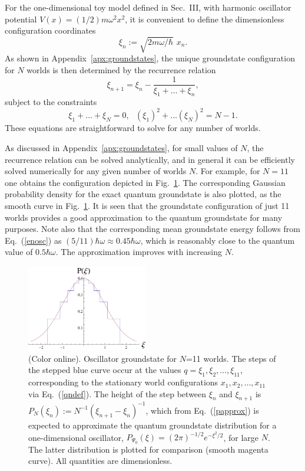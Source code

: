 \documentclass[twocolumn,aps,pra,amsmath,amssymb,superscriptaddress]{revtex4}
\renewcommand{\(}{\left(}
\renewcommand{\)}{\right)}
\newcommand{\blk}{\color{black}}
\begin{document}
For the one-dimensional toy model defined in Sec.~III, with harmonic oscillator potential $V(x)=(1/2)m\omega^2 x^2$, it is convenient to define the dimensionless configuration coordinates
\begin{equation} \label{qndef}
{\xi}_n := \sqrt{2m\omega/\hbar} \,\,x_n .
\end{equation}
As shown in Appendix~\ref{apx:groundstates}, the unique groundstate configuration for $N$ worlds is then determined by the recurrence relation
\begin{equation}
\label{recur3}
{ \xi}_{n+1} = { \xi}_n - \frac{1}{{ \xi}_1+\dots+{ \xi}_n},
\end{equation}
subject to the constraints
\begin{equation} \label{cond2}
{ \xi}_1+\dots+{ \xi}_N = 0,~~~({ \xi}_1)^2+\dots ({ \xi}_N)^2 = N-1.
\end{equation}
These equations are straightforward to solve for any number of worlds.

As discussed in Appendix~\ref{apx:groundstates}, for small values of 
$N$, the recurrence relation 
can be solved analytically, and in general it can be \blk 
efficiently solved numerically for any given number of worlds $N$.  For example,
for $N=11$ one obtains the configuration depicted in Fig.~\ref{oscground21}. The
corresponding Gaussian probability density for the exact quantum groundstate is
also plotted, as the smooth curve in Fig.~\ref{oscground21}.  It is seen that
the groundstate configuration of just 11 worlds provides a good approximation to
the quantum groundstate for many purposes.  Note also that the corresponding
mean \blk groundstate energy follows from Eq.~(\ref{enosc}) as
  $(5/11)\hbar\omega\approx 0.45\hbar\omega$, which is reasonably close to the
quantum value of $0.5\hbar\omega$.  The approximation improves with increasing
$N$.

\begin{figure}[!t]
	\centering
		\includegraphics[width=0.47\textwidth]{finite_world_groundstatesN11.pdf}	
\caption{\label{oscground21}(Color online). Oscillator groundstate for $N$=11 worlds.  The steps of
    the stepped blue curve occur at the values $q={ \xi}_1,{
    \xi}_2,\dots,{ \xi}_{11}$, corresponding to the stationary world
    configurations  $x_1,x_2,\dots,x_{11}$ via Eq.~(\ref{qndef}).  The height of
    the step between ${ \xi}_{n}$ and ${ \xi}_{n+1}$ is $P_N({
    \xi}_n):=N^{-1}({ \xi}_{n+1}-{ \xi}_n)^{-1}$, which from
    Eq.~(\ref{papprox}) is expected to approximate the quantum groundstate
    distribution for a one-dimensional oscillator,
    $P_{\Psi_0}(\xi)=(2\pi)^{-1/2}e^{-\xi^2/2}$, for large $N$.  The latter
    distribution is plotted for comparison (smooth magenta curve).
All quantities are dimensionless.}
\end{figure}
\end{document}
